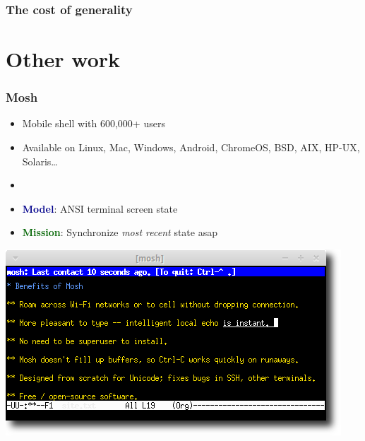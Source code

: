 \documentclass[svgnames]{beamer}
\begin{document}
\begin{frame}
\frametitle{The cost of generality}

\begin{centering}

\noindent {}

\end{centering}

\end{frame}

%
%
%
%
%
%
%
%
%
%

\section{Other work}

\begin{frame}
\frametitle{Mosh}

\large

\begin{itemize}

\item Mobile shell with 600,000+ users

\item Available on Linux, Mac, Windows, Android, ChromeOS, BSD, AIX, HP-UX, Solaris\ldots

\item[]

\item \textcolor{DarkBlue}{\bf Model}: ANSI terminal screen state

\item \textcolor{DarkGreen}{\bf Mission}: Synchronize \emph{most recent} state asap

\end{itemize}

\vspace{7 pt}

\begin{centering}

\includegraphics[width=6 cm]{mosh.png}

\end{centering}

\end{frame}

%
%
%
%
%
%
%
%

\end{document}
